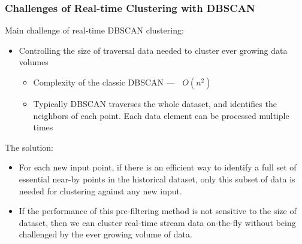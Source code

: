\begin{frame}
    \frametitle{Challenges of Real-time Clustering with DBSCAN}
	    Main challenge of real-time DBSCAN clustering:
        \begin{itemize}
            \item Controlling the size of traversal data needed to cluster ever growing data volumes
            \begin{itemize}
                \item  Complexity of the classic DBSCAN --- $~$ $O(n^2)$
                \item  Typically DBSCAN traverses the whole dataset, and identifies the neighbors of each point. Each data element can be processed multiple times
            \end{itemize}
        \end{itemize}
	    The solution:
	    \begin{itemize}
	        \item \small For each new input point, if there is an efficient way to identify a full set of essential near-by points in the historical dataset, only this subset of data is needed for clustering against any new input.
            \item \small If the performance of this pre-filtering method is not sensitive to the size of dataset, then we can cluster real-time stream data on-the-fly without being challenged by the ever growing volume of data.
	    \end{itemize}
\end{frame}

